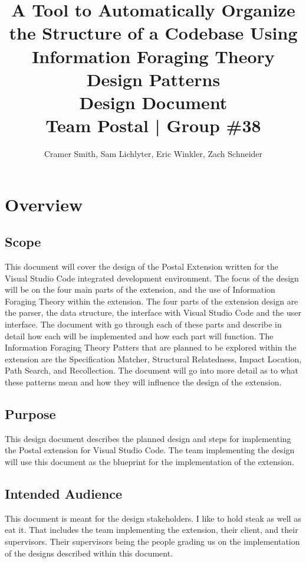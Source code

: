 \documentclass[letterpaper,10pt,titlepage,draftclsnofoot,onecolumn,onesided] {IEEEtran}
\def\doctitle{A Tool to Automatically Organize the Structure of a Codebase Using Information Foraging Theory Design Patterns}
\def\doctype{Design Document}
\def\team{Team Postal | Group \#38}
\begin{document}
\title{\Huge{\bfseries{\textsf{\doctitle}}}\\\textsf{\Large{\doctype}}\\\textsf{\large{\team}}}
\author{Cramer Smith, Sam Lichlyter, Eric Winkler, Zach Schneider}

\maketitle
\vfill
\vfill

\pagebreak

\tableofcontents

\pagebreak

\section{Overview}

\subsection{Scope}
This document will cover the design of the Postal Extension written for the Visual Studio Code integrated development environment. 
The focus of the design will be on the four main parts of the extension, and the use of Information Foraging Theory within the extension.
The four parts of the extension design are the parser, the data structure, the interface with Visual Studio Code and the user interface.
The document with go through each of these parts and describe in detail how each will be implemented and how each part will function.
The Information Foraging Theory Patters that are planned to be explored within the extension are the Specification Matcher, Structural Relatedness, Impact Location, Path Search, and Recollection.
The document will go into more detail as to what these patterns mean and how they will influence the design of the extension.

\subsection{Purpose}
This design document describes the planned design and steps for implementing the Postal extension for Visual Studio Code. 
The team implementing the design will use this document as the blueprint for the implementation of the extension. 

\subsection{Intended Audience}
This document is meant for the design stakeholders. I like to hold steak as well as eat it.
That includes the team implementing the extension, their client, and their supervisors. 
Their supervisors being the people grading us on the implementation of the designs described within this document.
\end{document}
